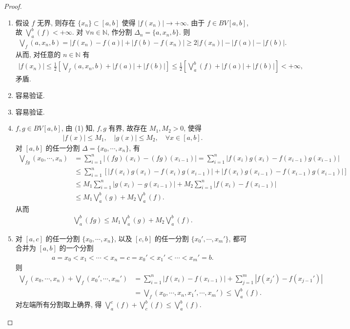 \documentclass[../../main.tex]{subfiles}%
\begin{document}
\begin{proof}
\begin{enumerate}[(1)]
\item 假设 $f$ 无界, 则存在 $\{x_n\}\subset[a,b]$ 使得 $|f(x_n)|\to+\infty$. 由于 $f\in BV[a,b]$, 故 $\bigvee_a^b(f)<+\infty$. 对 $\forall n\in\mathbb{N}$, 作分割 $\Delta_n=\{a,x_n,b\}$. 则
\begin{align*}
\bigvee_f(a,x_n,b) = |f(x_n)-f(a)|+|f(b)-f(x_n)| 
\geqslant 2|f(x_n)|-|f(a)|-|f(b)|.
\end{align*}
从而, 对任意的 $n\in\mathbb{N}$ 有
\begin{align*}
|f(x_n)| \leqslant \frac{1}{2}\left[\bigvee_f(a,x_n,b)+|f(a)|+|f(b)|\right] \leqslant \frac{1}{2}\left[\bigvee_a^b(f)+|f(a)|+|f(b)|\right]<+\infty,
\end{align*}
矛盾.

\item 容易验证.

\item 容易验证.

\item  $f,g\in BV[a,b]$, 由 (1) 知, $f,g$ 有界, 故存在 $M_1,M_2>0$, 使得
\begin{align*}
|f(x)|\leqslant M_1,\quad |g(x)|\leqslant M_2,\quad \forall x\in[a,b].
\end{align*}
对 $[a,b]$ 的任一分割 $\Delta=\{x_0,\cdots,x_n\}$, 有
\begin{align*}
\bigvee_{fg}(x_0,\cdots,x_n) &= \sum_{i=1}^n |(fg)(x_i)-(fg)(x_{i-1})| 
= \sum_{i=1}^n |f(x_i)g(x_i)-f(x_{i-1})g(x_{i-1})| \\
&\leqslant \sum_{i=1}^n \left[|f(x_i)g(x_i)-f(x_i)g(x_{i-1})|+|f(x_i)g(x_{i-1})-f(x_{i-1})g(x_{i-1})|\right] \\
&\leqslant M_1\sum_{i=1}^n |g(x_i)-g(x_{i-1})|+M_2\sum_{i=1}^n |f(x_i)-f(x_{i-1})| \\
&\leqslant M_1\bigvee_a^b(g)+M_2\bigvee_a^b(f).
\end{align*}
从而
\begin{align*}
\bigvee_a^b(fg)\leqslant M_1\bigvee_a^b(g)+M_2\bigvee_a^b(f).
\end{align*}

\item 对 $[a,c]$ 的任一分割 $\{x_0,\cdots,x_n\}$, 以及 $[c,b]$ 的任一分割 $\{x_0',\cdots,x_m'\}$, 都可合并为 $[a,b]$ 的一个分割
\begin{align*}
a=x_0<x_1<\cdots<x_n=c=x_0'<x_1'<\cdots<x_m'=b.
\end{align*}
则
\begin{align*}
\bigvee_f(x_0,\cdots,x_n)+\bigvee_f(x_0',\cdots,x_m') &= \sum_{i=1}^n |f(x_i)-f(x_{i-1})|+\sum_{j=1}^m |f(x_j')-f(x_{j-1}')| \\
&= \bigvee_f(x_0,\cdots,x_n,x_1',\cdots,x_m')
\leqslant \bigvee_a^b(f).
\end{align*}
对左端所有分割取上确界, 得 $\bigvee_a^c(f)+\bigvee_c^b(f)\leqslant\bigvee_a^b(f)$.


\end{enumerate}
\end{proof}
\end{document}
